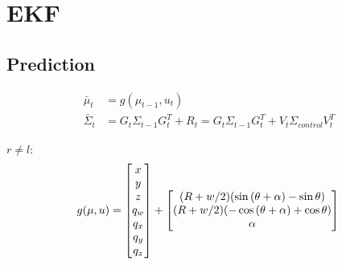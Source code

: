 \documentclass[oneside, 12pt, a4paper]{book}
\begin{document}
\chapter{EKF}

\section{Prediction}
\begin{equation}
    \begin{split}
        \bar{\mu}_t &= g(\mu_{t-1}, u_t) \\
        \bar{\Sigma}_t &= G_t \Sigma_{t-1} G_t^T + R_t = G_t \Sigma_{t-1} G_t^T + V_t \Sigma_{control} V_t^T 
    \end{split}
\end{equation}

$r \neq l$:
\begin{equation}
    g(\mu, u) = 
    \begin{bmatrix}
        x \\ y \\ z \\
        q_w \\ q_x \\ q_y \\ q_z 
    \end{bmatrix}
    +
    \begin{bmatrix}
        (R+w/2)(\sin{(\theta + \alpha)} - \sin{\theta}) \\
        (R+w/2)(-\cos{(\theta + \alpha)} + \cos{\theta}) \\
        \alpha \\
    \end{bmatrix}\\
\end{equation}
\end{document}
